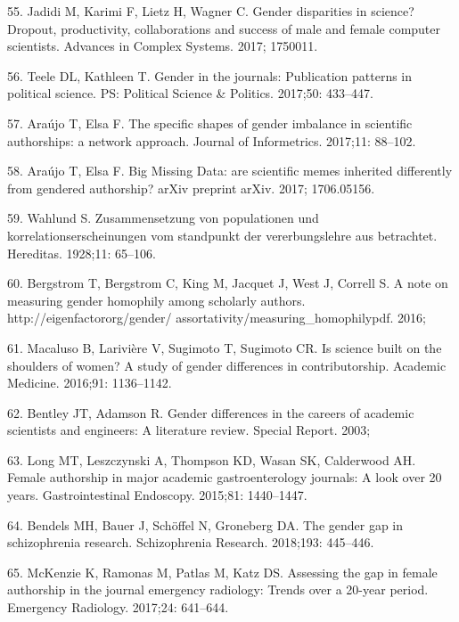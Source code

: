 \documentclass[12pt,]{article}
\begin{document}
\hypertarget{ref-Jadidi_2017}{}
55. Jadidi M, Karimi F, Lietz H, Wagner C. Gender disparities in
science? Dropout, productivity, collaborations and success of male and
female computer scientists. Advances in Complex Systems. 2017; 1750011.

\hypertarget{ref-Teele_2017}{}
56. Teele DL, Kathleen T. Gender in the journals: Publication patterns
in political science. PS: Political Science \& Politics. 2017;50:
433--447.

\hypertarget{ref-Araujo_2017a}{}
57. Araújo T, Elsa F. The specific shapes of gender imbalance in
scientific authorships: a network approach. Journal of Informetrics.
2017;11: 88--102.

\hypertarget{ref-Araujo_2017b}{}
58. Araújo T, Elsa F. Big Missing Data: are scientific memes inherited
differently from gendered authorship? arXiv preprint arXiv. 2017;
1706.05156.

\hypertarget{ref-Wahlund_1928}{}
59. Wahlund S. Zusammensetzung von populationen und
korrelationserscheinungen vom standpunkt der vererbungslehre aus
betrachtet. Hereditas. 1928;11: 65--106.

\hypertarget{ref-bergstrom_2016}{}
60. Bergstrom T, Bergstrom C, King M, Jacquet J, West J, Correll S. A
note on measuring gender homophily among scholarly authors.
http://eigenfactororg/gender/ assortativity/measuring\_homophilypdf.
2016;

\hypertarget{ref-macaluso_2016}{}
61. Macaluso B, Larivière V, Sugimoto T, Sugimoto CR. Is science built
on the shoulders of women? A study of gender differences in
contributorship. Academic Medicine. 2016;91: 1136--1142.

\hypertarget{ref-Bentley_2003}{}
62. Bentley JT, Adamson R. Gender differences in the careers of academic
scientists and engineers: A literature review. Special Report. 2003;

\hypertarget{ref-Long_2015}{}
63. Long MT, Leszczynski A, Thompson KD, Wasan SK, Calderwood AH. Female
authorship in major academic gastroenterology journals: A look over 20
years. Gastrointestinal Endoscopy. 2015;81: 1440--1447.

\hypertarget{ref-Bendels_2018}{}
64. Bendels MH, Bauer J, Schöffel N, Groneberg DA. The gender gap in
schizophrenia research. Schizophrenia Research. 2018;193: 445--446.

\hypertarget{ref-McKenzie_2017}{}
65. McKenzie K, Ramonas M, Patlas M, Katz DS. Assessing the gap in
female authorship in the journal emergency radiology: Trends over a
20-year period. Emergency Radiology. 2017;24: 641--644.
\end{document}
